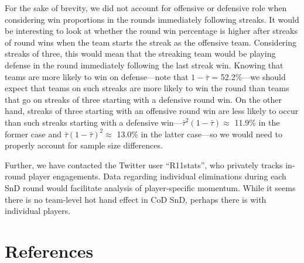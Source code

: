 \documentclass{article}
\begin{document}
For the sake of brevity, we did not account for offensive or defensive
role when considering win proportions in the rounds immediately
following streaks. It would be interesting to look at whether the round
win percentage is higher after streaks of round wins when the team
starts the streak as the offensive team. Considering streaks of three,
this would mean that the streaking team would be playing defense in the
round immediately following the last streak win. Knowing that teams are
more likely to win on defense---note that \(1 - \bar{\tau}\) =
52.2\%---we should expect that teams on such streaks are more likely to
win the round than teams that go on streaks of three starting with a
defensive round win. On the other hand, streaks of three starting with
an offensive round win are less likely to occur than such streaks
starting with a defensive
win---\(\bar{\tau}^2 (1 - \bar{\tau}) \approx\) 11.9\% in the former
case and \(\bar{\tau} (1 - \bar{\tau})^2 \approx\) 13.0\% in the latter
case---so we would need to properly account for sample size differences.

Further, we have contacted the Twitter user ``R11stats'', who privately
tracks in-round player engagements. Data regarding individual
eliminations during each SnD round would facilitate analysis of
player-specific momentum. While it seems there is no team-level hot hand
effect in CoD SnD, perhaps there is with individual players.

\hypertarget{references}{%
\section*{References}\label{references}}
\end{document}
